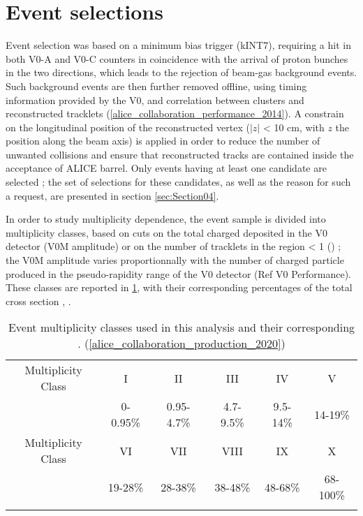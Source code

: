 \newpage
\section{Event selections}
\label{sec:Section03}

Event selection was based on a minimum bias trigger (kINT7), requiring a hit in both V0-A and V0-C counters in coincidence with the arrival of proton bunches in the two directions, which leads to the rejection of beam-gas background events. Such background events are then further removed offline, using timing information provided by the V0, and correlation between clusters and reconstructed tracklets (\ref{alice_collaboration_performance_2014}). A constrain on the longitudinal position of the reconstructed vertex ($|z|$ < 10 cm, with $z$ the position along the beam axis) is applied in order to reduce the number of unwanted collisions and ensure that reconstructed tracks are contained inside the acceptance of ALICE barrel. Only events having at least one \rmOmegaPM candidate are selected ; the set of selections for these candidates, as well as the reason for such a request, are presented in section \ref{sec:Section04}.

In order to study multiplicity dependence, the event sample is divided into multiplicity classes, based on cuts on the total charged deposited in the V0 detector (V0M amplitude) or on the number of tracklets in the region \abspseudorap < 1 (\Ntracklet) ; the V0M amplitude varies proportionnally with the number of charged particle produced in the pseudo-rapidity range of the V0 detector (Ref V0 Performance). These classes are reported in \tab \ref{MultClass}, with their corresponding percentages of the total cross section \INELZero, \sigmaINELZero.

\begin{table}[h]
    \centering
    \begin{tabular}{c|ccccc}
    \noalign{\smallskip}\hline \hline \noalign{\smallskip}
    Multiplicity Class & I & II & III & IV & V \\
	\sigmaINELZero & 0-0.95\% & 0.95-4.7\% & 4.7-9.5\% & 9.5-14\% & 14-19\% \\	        	\noalign{\smallskip}\hline \hline \noalign{\smallskip}
	Multiplicity Class & VI & VII & VIII & IX & X \\
	\sigmaINELZero & 19-28\% & 28-38\% & 38-48\% & 48-68\% & 68-100\% \\
    \noalign{\smallskip}\hline \hline \noalign{\smallskip}
    \end{tabular}
    \caption{Event multiplicity classes used in this analysis and their corresponding \sigmaINELZero. (\ref{alice_collaboration_production_2020})}\label{MultClass}
\end{table}
